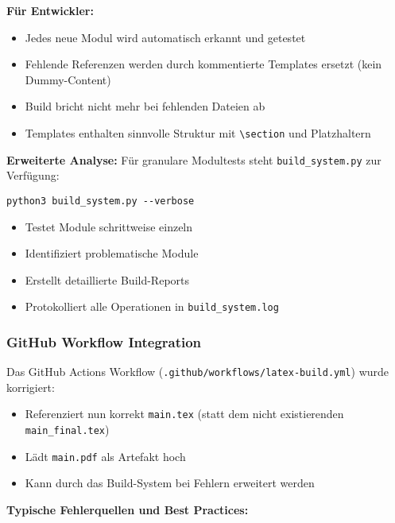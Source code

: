 \textbf{Für Entwickler:}
\begin{itemize}
\tightlist
\item
  Jedes neue Modul wird automatisch erkannt und getestet
\item
  Fehlende Referenzen werden durch kommentierte Templates ersetzt (kein Dummy-Content)
\item
  Build bricht nicht mehr bei fehlenden Dateien ab
\item
  Templates enthalten sinnvolle Struktur mit \verb|\section| und Platzhaltern
\end{itemize}

\textbf{Erweiterte Analyse:}
Für granulare Modultests steht \texttt{build\_system.py} zur Verfügung:
\begin{verbatim}
python3 build_system.py --verbose
\end{verbatim}

\begin{itemize}
\tightlist
\item
  Testet Module schrittweise einzeln
\item
  Identifiziert problematische Module
\item
  Erstellt detaillierte Build-Reports
\item
  Protokolliert alle Operationen in \texttt{build\_system.log}
\end{itemize}

\hypertarget{github-workflow-integration}{%
\subsubsection{GitHub Workflow Integration}\label{github-workflow-integration}}

Das GitHub Actions Workflow (\texttt{.github/workflows/latex-build.yml}) wurde korrigiert:
\begin{itemize}
\tightlist
\item
  Referenziert nun korrekt \texttt{main.tex} (statt dem nicht existierenden \texttt{main\_final.tex})
\item
  Lädt \texttt{main.pdf} als Artefakt hoch
\item
  Kann durch das Build-System bei Fehlern erweitert werden
\end{itemize}

\textbf{Typische Fehlerquellen und Best Practices:}

